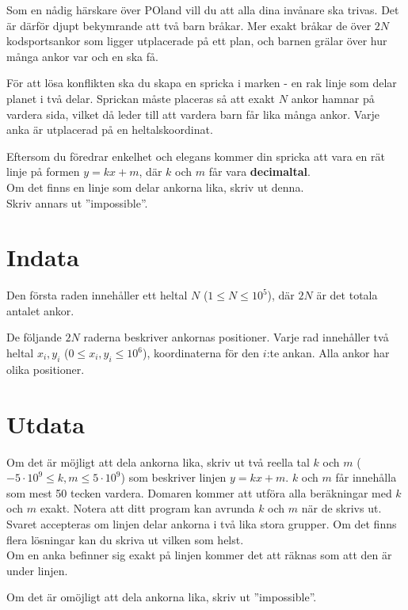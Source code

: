 \noindent

Som en nådig härskare över POland vill du att alla dina invånare ska trivas. Det är därför djupt bekymrande
att två barn bråkar. Mer exakt bråkar de över $2N$ kodsportsankor som ligger
utplacerade på ett plan, och barnen grälar över hur många ankor var och en ska få.

För att lösa konflikten ska du skapa en spricka i marken - en rak linje som delar planet i två delar.
Sprickan måste placeras så att exakt $N$ ankor hamnar på vardera sida, vilket då leder till att vardera barn
får lika många ankor. Varje anka är utplacerad på en heltalskoordinat.

Eftersom du föredrar enkelhet och elegans kommer din spricka att vara en rät linje på formen $y=kx+m$,
där $k$ och $m$ får vara \textbf{decimaltal}. \\
Om det finns en linje som delar ankorna lika, skriv ut denna.\\ 
Skriv annars ut ''impossible''.

\section*{Indata}
Den första raden innehåller ett heltal $N$ ($1 \leq N \leq 10^5$), där $2N$ är det totala antalet ankor.

De följande $2N$ raderna beskriver ankornas positioner.
Varje rad innehåller två heltal $x_i, y_i$ ($0 \leq x_i, y_i \leq 10^6$), koordinaterna för den $i$:te ankan.
Alla ankor har olika positioner.

\section*{Utdata}
Om det är möjligt att dela ankorna lika, skriv ut två reella tal $k$ och $m$ ($-5 \cdot 10^9 \leq k, m \leq 5 \cdot 10^9$) som beskriver linjen $y = kx + m$.
$k$ och $m$ får innehålla som mest 50 tecken vardera. Domaren kommer att utföra alla beräkningar med $k$ och $m$ exakt. Notera att
ditt program kan avrunda $k$ och $m$ när de skrivs ut. \\
Svaret accepteras om linjen delar ankorna i två lika stora grupper. Om det finns flera lösningar kan du skriva ut vilken som helst.\\
Om en anka befinner sig exakt på linjen kommer det att räknas som att den är under linjen. 

Om det är omöjligt att dela ankorna lika, skriv ut ''impossible''.

